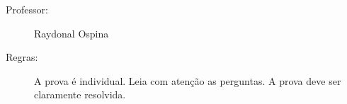 \documentclass[a4paper,11pt,oneside,twocolumn]{Config/milktest}
\begin{document}
	
	
	
	
	\beb
	{\small
		\begin{description}
			\item[Professor:] Raydonal Ospina
			
			\item[Regras:] A prova é individual. Leia com atenção as perguntas. A prova deve ser claramente resolvida. 
			
		\end{description}
	}
	\eeb
	
	\balance
	
	
	
\end{document}
